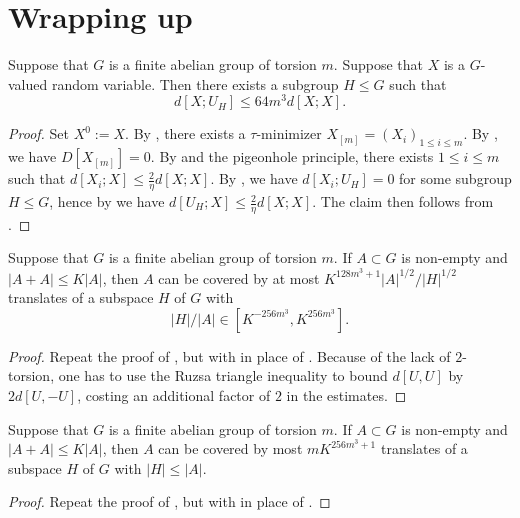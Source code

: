 \section{Wrapping up}

\begin{theorem}\label{main-entropy}\leanok Suppose that $G$ is a finite abelian group of torsion $m$.  Suppose that $X$ is a $G$-valued random variable. Then there exists a subgroup $H \leq G$ such that \[ d[X;U_H] \leq 64 m^3 d[X;X].\]
\end{theorem}

\begin{proof}\leanok  Set $X^0 := X$. By , there exists a $\tau$-minimizer $X_{[m]} = (X_i)_{1 \leq i \leq m}$.  By , we have $D[X_{[m]}]=0$. By  and the pigeonhole principle, there exists $1 \leq i \leq m$ such that $d[X_i; X] \leq \frac{2}{\eta} d[X;X]$.  By , we have $d[X_i;U_H]=0$ for some subgroup $H \leq G$, hence by  we have $d[U_H; X] \leq \frac{2}{\eta} d[X;X]$. The claim then follows from .
\end{proof}

\begin{lemma}\label{pfr_aux_torsion}\leanok  Suppose that $G$ is a finite abelian group of torsion $m$.  If $A \subset G$ is non-empty and
  $|A+A| \leq K|A|$, then $A$ can be covered by at most $K ^
  {128m^3+1}|A|^{1/2}/|H|^{1/2}$ translates of a subspace $H$ of $G$ with
  \begin{equation}
    \label{ah2}
    |H|/|A| \in [K^{-256m^3}, K^{256m^3}].
  \end{equation}
  \end{lemma}

\begin{proof}\leanok  Repeat the proof of , but with  in place of .  Because of the lack of $2$-torsion, one has to use the Ruzsa triangle inequality to bound $d[U,U]$ by $2d[U,-U]$, costing an additional factor of $2$ in the estimates.
\end{proof}

\begin{theorem}[PFR]\label{pfr-torsion}\leanok  Suppose that $G$ is a finite abelian group of torsion $m$.
  If $A \subset G$ is non-empty and $|A+A| \leq K|A|$, then $A$ can be covered by most $mK^{256m^3+1}$ translates of a subspace $H$ of $G$ with $|H| \leq |A|$.
  \end{theorem}

  \begin{proof}\leanok Repeat the proof of , but with  in place of .
  \end{proof}
